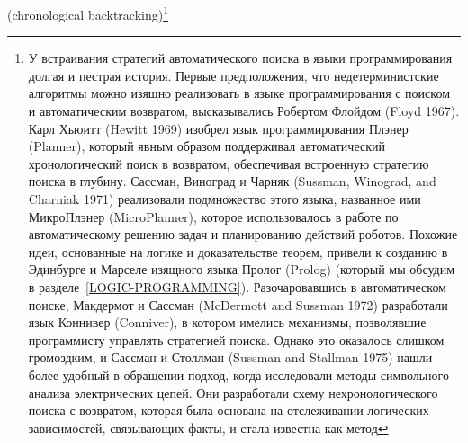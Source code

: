(chronological backtracking)\footnote{\label{F4.47}У встраивания %
стратегий автоматического поиска в языки
программирования долгая и пестрая история.  Первые предположения, что
недетерминистские алгоритмы можно изящно реализовать в языке
программирования с поиском и автоматическим возвратом, высказывались
Робертом Флойдом (Floyd 1967).
Карл Хьюитт 
(Hewitt 1969) 
изобрел язык программирования Плэнер 
(Planner),
который явным образом поддерживал автоматический хронологический поиск
в возвратом, обеспечивая встроенную стратегию поиска в глубину.
Сассман,
Виноград
и Чарняк
(Sussman, Winograd, and Charniak 1971) 
реализовали
подмножество этого языка, названное ими МикроПлэнер (MicroPlanner), которое
использовалось в работе по автоматическому решению задач и планированию действий
роботов.  Похожие идеи, основанные на логике и доказательстве теорем,
привели к созданию в Эдинбурге и Марселе изящного языка Пролог (Prolog)
(который мы обсудим в разделе~\ref{LOGIC-PROGRAMMING}).
Разочаровавшись в автоматическом поиске, Макдермот и Сассман 
(McDermott and Sussman 1972) разработали 
язык Коннивер
(Conniver), в котором имелись механизмы, позволявшие программисту
управлять стратегией поиска.  Однако это оказалось слишком громоздким,
и Сассман и Столлман (Sussman and Stallman 1975)
нашли более удобный в обращении подход, когда исследовали методы 
символьного анализа электрических
цепей.  Они разработали схему нехронологического поиска с возвратом,
которая была основана на отслеживании логических зависимостей,
связывающих факты, и стала известна как метод 
}
